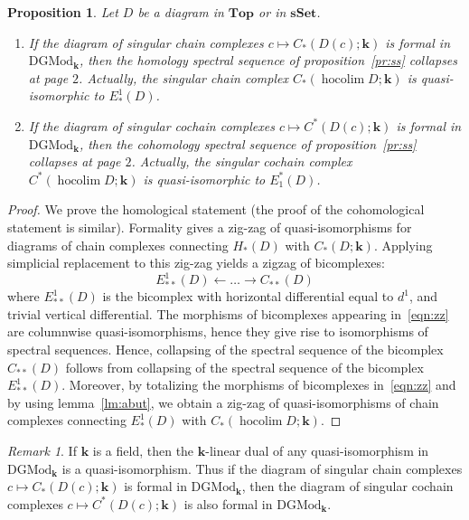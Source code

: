 \documentclass{amsart}
\newtheorem{proposition}[formula]{Proposition}
\theoremstyle{definition}
\theoremstyle{remark}
\newtheorem{remark}[formula]{Remark}
\DeclareMathOperator{\hoc}{hocolim}
\newcommand{\ot}{\leftarrow}
\newcommand{\sset}{\mathbf{sSet}}
\renewcommand{\top}{\mathbf{Top}}
\def\k{\mathbf{k}}
\begin{document}
\begin{proposition}\label{pr:collapse}
	Let $D$ be a diagram in $\top$ or in $\sset$. 
	\begin{enumerate}
		\item If the diagram of singular chain complexes $c\mapsto C_*(D(c);\k)$ is formal in $\mathrm{DGMod}_\k$, then the homology spectral sequence of proposition~\ref{pr:ss} collapses at page $2$. Actually, the singular chain complex $C_*( \hoc D;\k)$ is quasi-isomorphic to $E^1_*(D)$.
		\item If the diagram of singular cochain complexes $c\mapsto C^*(D(c);\k)$ is formal in $\mathrm{DGMod}_\k$, then the cohomology spectral sequence of proposition~\ref{pr:ss} collapses at page $2$. Actually, the singular cochain complex $C^*( \hoc D;\k)$ is quasi-isomorphic to $E_1^*(D)$.
	\end{enumerate}
\end{proposition}
\begin{proof}
	We prove the homological statement (the proof of the cohomological statement is similar). Formality gives a zig-zag of quasi-isomorphisms for diagrams of chain complexes connecting $H_*(D)$ with $C_*(D;\k)$. Applying simplicial replacement to this zig-zag yields a zigzag of bicomplexes:
	\begin{equation}\label{eqn:zz}
		E^1_{**}(D)\ot \dots \to C_{**}(D) 
	\end{equation}
	where $E_{**}^1(D)$ is the bicomplex with horizontal differential equal to $d^1$, and trivial vertical differential. The morphisms of bicomplexes appearing in~\eqref{eqn:zz} are columnwise quasi-isomorphisms, hence they give rise to isomorphisms of spectral sequences. Hence, collapsing of the spectral sequence of the bicomplex $C_{**}(D)$ follows from collapsing of the spectral sequence of the bicomplex $E_{**}^1(D)$. Moreover, by totalizing the morphisms of bicomplexes in~\eqref{eqn:zz} and by using lemma~\ref{lm:abut}, we obtain a zig-zag of quasi-isomorphisms of chain complexes connecting $E_*^1(D)$ with $C_*( \hoc D;\k)$.
\end{proof}

\begin{remark}\label{rk:duality}
	If $\k$ is a field, then the $\k$-linear dual of any quasi-isomorphism in $\mathrm{DGMod}_\k$ is a quasi-isomorphism. Thus if the diagram of singular chain complexes $c\mapsto C_*(D(c);\k)$ is formal in $\mathrm{DGMod}_\k$, then the diagram of singular cochain complexes  $c\mapsto C^*(D(c);\k)$ is also formal in $\mathrm{DGMod}_\k$.
\end{remark}
\end{document}
